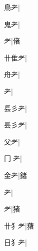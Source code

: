 \begin{multicols}{2}
{{\cjk{}{\cnsym{}　}鳥耂}\mktsJzrVerticalBar{}{\cjk{}{\cnsym{}　}{\cnsym{}　}{\cnsym{}　}}|{}\par
{\cjk{}{\cnsym{}　}鬼耂}\mktsJzrVerticalBar{}{\cjk{}{\cnsym{}　}{\cnsym{}　}{\cnsym{}　}}|{}\par
{耂}\mktsJzrVerticalBar{}{\cjk{}{\cnsym{}　}{\cnsym{}　}{\cnsym{}　}}|{\cjk{}偖}\par
{\cjk{}卄隹耂}\mktsJzrVerticalBar{}{\cjk{}{\cnsym{}　}{\cnsym{}　}{\cnsym{}　}}|{}\par
{\cjk{}{\cnsym{}　}舟耂}\mktsJzrVerticalBar{}{\cjk{}{\cnsym{}　}{\cnsym{}　}{\cnsym{}　}}|{}\par
{耂}\mktsJzrVerticalBar{}{\cjk{}{\cnsym{}　}{\cnsym{}　}{\cnsym{}　}}|{}\par
{\cjk{}镸彡耂}\mktsJzrVerticalBar{}{\cjk{}{\cnsym{}　}{\cnsym{}　}{\cnsym{}　}}|{}\par
{\cjk{}镸彡耂}\mktsJzrVerticalBar{}{\cjk{}{\cnsym{}　}{\cnsym{}　}{\cnsym{}　}}|{}\par
{\cjk{}{\cnsym{}　}父耂}\mktsJzrVerticalBar{}{\cjk{}{\cnsym{}　}{\cnsym{}　}{\cnsym{}　}}|{}\par
{\cjk{}冂{\cnjzr{}}耂}\mktsJzrVerticalBar{}{\cjk{}{\cnsym{}　}{\cnsym{}　}{\cnsym{}　}}|{}\par
{\cjk{}{\cnsym{}　}金耂}\mktsJzrVerticalBar{}{\cjk{}{\cnsym{}　}{\cnsym{}　}{\cnsym{}　}}|{\cjk{}鍺}\par
{耂}\mktsJzrVerticalBar{}{\cjk{}{\cnsym{}　}{\cnsym{}　}{\cnsym{}　}}|{}\par
{耂}\mktsJzrVerticalBar{}{\cjk{}{\cnsym{}　}{\cnsym{}　}{\cnsym{}　}}|{\cjk{}猪}\par
{\cjk{}卄{犭}耂}\mktsJzrVerticalBar{}{\cjk{}{\cnsym{}　}{\cnsym{}　}{\cnsym{}　}}|{\cjk{}蕏}\par
{\cjk{}日{犭}耂}\mktsJzrVerticalBar{}{\cjk{}{\cnsym{}　}{\cnsym{}　}{\cnsym{}　}}|{}\par
}
\end{multicols}
